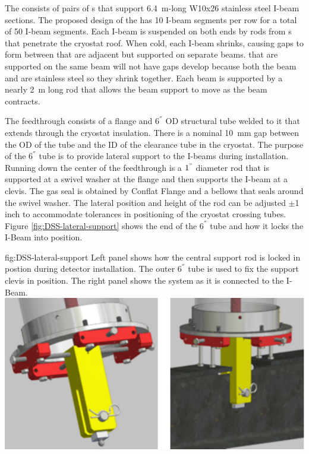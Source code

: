  The 
consists of pairs of \fdth{}s that support \SI{6.4}{m}-long
W10x26 stainless steel I-beam sections. The proposed design of the
 has \num{10} I-beam segments per row for a total of
\num{50} I-beam segments. Each I-beam is suspended on both ends by
rods from \fdth{}s that penetrate the cryostat roof.  %
When cold, each I-beam shrinks, causing gaps to form between
 that are adjacent but supported on separate beams.
 that are supported on the same beam will not have gaps
develop because both the beam and  are stainless steel so
they shrink together.  Each beam is supported by a nearly
\SI{2}{m} long rod that allows the beam support to move as the beam
contracts.


The feedthrough consists of a flange and $6 ^{''}$ OD structural tube welded to it that extends through the cryostat insulation.  
There is a
nominal \SI{10}{mm} gap between the OD of the tube and the ID of the clearance tube in the cryostat.  
The purpose of the $6 ^{''}$ tube is to provide lateral support to the I-beams during installation.
Running down the center of the feedthrough is a $1^{"}$ diameter rod that
is supported at a swivel washer at the flange and then supports the
I-beam at a clevis.  The gas seal is obtained by Conflat Flange and a
bellows that seals around the swivel washer.  The lateral position and height of the rod can be adjusted $\pm$1 inch to accommodate tolerances in positioning of the cryostat crossing tubes. Figure \ref{fig:DSS-lateral-support} shows the end of the $6 ^{''}$ tube and how it locks the I-Beam into position. 

\begin{dunefigure}{fig:DSS-lateral-support}
  {Left panel shows how the central support rod is locked in postion during detector installation. The outer $6 ^{''}$ tube is used to fix the support clevis in position. The right panel shows the system as it is connected to the I-Beam.}
\includegraphics[width=.75\textwidth]{graphics/dss-lateral-support.pdf}
\end{dunefigure}

